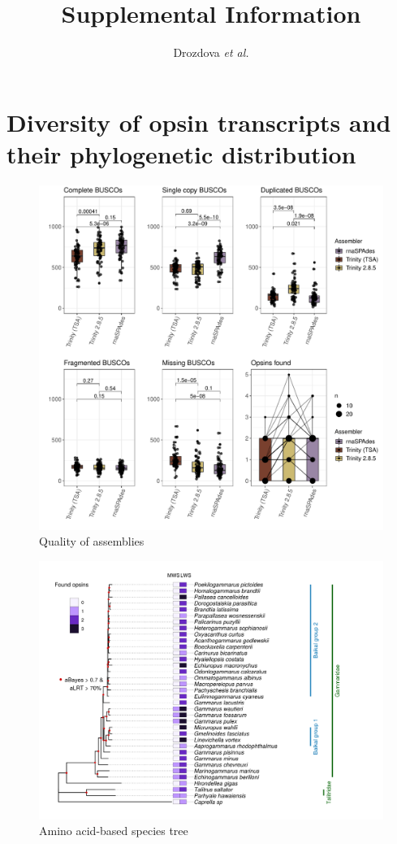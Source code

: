 \documentclass{article}
\begin{document}
	
\title{Supplemental Information} %
\author{Drozdova \textit{et al.}} %
\maketitle

\section{Diversity of opsin transcripts and their phylogenetic distribution}

\begin{figure}[H] 
\hskip -1cm \includegraphics[scale=0.8]{./FigS1_assembly_comparison.pdf}
	\caption{Quality of assemblies} \end{figure}


\begin{figure}[H] 
	\includegraphics[scale=0.85]{FigS2_aa_tree.png}
	\caption{Amino acid-based species tree} \end{figure}
\end{document}
